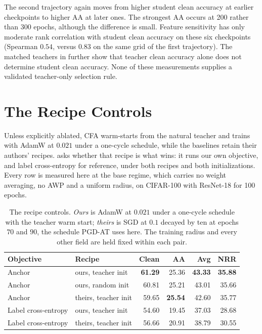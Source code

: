 The second trajectory again moves from higher student clean accuracy at earlier checkpoints to
higher AA at later ones. The strongest AA occurs at 200 rather than 300 epochs, although the
difference is small. Feature sensitivity has only moderate rank correlation with student clean
accuracy on these six checkpoints (Spearman $0.54$, versus $0.83$ on the same grid of the first
trajectory). The matched teachers in  further show that teacher clean
accuracy alone does not determine student clean accuracy. None of these measurements supplies a
validated teacher-only selection rule.

\section{The Recipe Controls}
\label{app:recipe}

Unless explicitly ablated, CFA warm-starts from the natural teacher and trains with AdamW at $0.021$
under a one-cycle schedule, while the baselines retain their authors' recipes.  asks
whether that recipe is what wins: it runs our own objective, and label cross-entropy for reference,
under both recipes and both initializations. Every row is measured here at the base regime, which
carries no weight averaging, no AWP and a uniform radius, on CIFAR-100 with ResNet-18 for 100 epochs.

\begin{table}[!htbp]
  \centering \small \setlength{\tabcolsep}{5pt}
  \caption{The recipe controls. \emph{Ours} is AdamW at $0.021$ under a one-cycle schedule with the
  teacher warm start; \emph{theirs} is SGD at $0.1$ decayed by ten at epochs $70$ and $90$, the
  schedule PGD-AT uses here. The training radius and every other field are held fixed within each
  pair.}
  \label{tab:recipe}
  \begin{tabular}{llrrrr}
    \toprule
    Objective & Recipe & Clean & AA & Avg & NRR \\
    \midrule
    Anchor              & ours, teacher init   & \textbf{61.29} & 25.36 & \textbf{43.33} & \textbf{35.88} \\
    Anchor              & ours, random init    & 60.81 & 25.21 & 43.01 & 35.66 \\
    Anchor              & theirs, teacher init & 59.65 & \textbf{25.54} & 42.60 & 35.77 \\
    \midrule
    Label cross-entropy & ours, teacher init   & 54.60 & 19.45 & 37.03 & 28.68 \\
    Label cross-entropy & theirs, teacher init & 56.66 & 20.91 & 38.79 & 30.55 \\
    \bottomrule
  \end{tabular}
\end{table}



